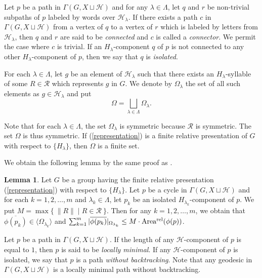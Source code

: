 \documentclass{amsart}
\theoremstyle{definition}
\newtheorem{Lem}[Thm]{Lemma}
\begin{document}
Let $p$ be a path in $\Gamma(G,X\sqcup {\mathcal H})$ and for any $\lambda\in\Lambda$, let $q$ and $r$ be non-trivial subpaths of $p$ labeled by words over ${\mathcal H}_\lambda$. 
If there exists a path $c$ in $\Gamma(G,X\sqcup {\mathcal H})$ from a vertex of $q$ to a vertex of $r$ which is labeled by letters from ${\mathcal H}_\lambda$, then $q$ and $r$ are said to be {\it connected} and $c$ is called a {\it connector}. 
We permit the case where $c$ is trivial. 
If an $H_\lambda$-component $q$ of $p$ is not connected to any other $H_\lambda$-component of $p$, then we say that $q$ is {\it isolated}. 

For each $\lambda\in \Lambda$, let $g$ be an element of ${\mathcal H}_\lambda$ such that there exists an $H_\lambda$-syllable of some $R\in {\mathcal R}$ which represents $g$ in $G$. 
We denote by $\Omega_\lambda$ the set of all such elements as $g \in {\mathcal H}_\lambda$ and put 
\begin{equation}\label{omega}
\Omega=\bigsqcup_{\lambda \in \Lambda}\Omega_\lambda.
\end{equation}

Note that for each $\lambda\in\Lambda$, the set $\Omega_\lambda$ is symmetric because ${\mathcal R}$ is symmetric. 
The set $\Omega$ is thus symmetric. 
If (\ref{representation}) is a finite relative presentation of $G$ with respect to $\{H_\lambda\}$, then $\Omega$ is a finite set. 

We obtain the following lemma by the same proof as \cite[Lemma 2.27]{Osi06}. 

\begin{Lem}\label{lem_2.27}
Let $G$ be a group having the finite relative presentation (\ref{representation}) with respect to $\{H_\lambda\}$. 
Let $p$ be a cycle in $\Gamma(G,X\sqcup{\mathcal H})$ and for each $k=1,2,\ldots,m$ and $\lambda_k \in \Lambda$, let $p_k$ be an isolated $H_{\lambda_k}$-component of $p$. 
We put $M=\max\{\ \|R\| \mid R\in{\mathcal R} \ \}$. 
Then for any $k=1,2,\ldots,m$, we obtain that $\overline{\phi(p_k)}\in \langle \Omega_{\lambda_k}\rangle$ and $\sum_{k=1}^m |\overline{\phi(p_k)}|_{\Omega_{\lambda_k}}\leq M\cdot {{\rm Area^{rel}}}(\phi(p))$. 
\end{Lem}

Let $p$ be a path in $\Gamma(G,X\sqcup {\mathcal H})$. 
If the length of any ${\mathcal H}$-component of $p$ is equal to $1$, then $p$ is said to be {\it locally minimal}. 
If any ${\mathcal H}$-component of $p$ is isolated, we say that $p$ is a path {\it without backtracking}. 
Note that any geodesic in $\Gamma(G,X\sqcup {\mathcal H})$ is a locally minimal path without backtracking. 
\end{document}
